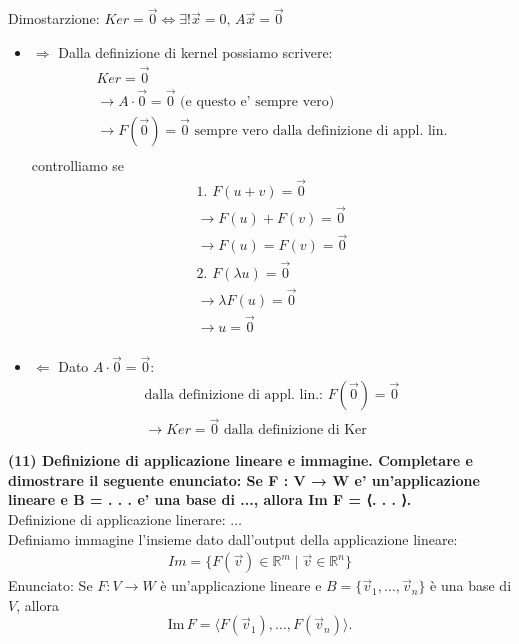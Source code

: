 \documentclass[10pt]{extarticle}
\begin{document}
Dimostarzione: $Ker=\vec{0} \iff \exists! \vec{x}=0, \, A\vec{x}=\vec{0}$ \\
\begin{itemize}
    \item $\Rightarrow$ Dalla definizione di kernel possiamo scrivere:
    \begin{align*}
        Ker=\vec{0} \\
        \to A\cdot\vec{0}=\vec{0} \text{ (e questo e' sempre vero)}\\
        \to F(\vec{0})=\vec{0} \text{ sempre vero dalla definizione di appl. lin.}\\
    \end{align*}
    controlliamo se 
    \begin{align*}
       \text{1. } F(u+v)=\vec{0}\\
       \to F(u)+F(v)=\vec{0} \\
       \to F(u)=F(v)=\vec{0} \\
       \text{2. } F(\lambda u)=\vec{0} \\
       \to \lambda F(u) =\vec{0} \\
       \to u=\vec{0} \\
    \end{align*}
    \item $\Leftarrow$ Dato $A\cdot \vec{0} = \vec{0}$:
    \begin{align*}
        \text{dalla definizione di appl. lin.: } F(\vec{0})=\vec{0} \\
        \to Ker=\vec{0} \text{ dalla definizione di Ker}
    \end{align*}
\end{itemize}
\vspace{1em} 
\textbf{(11) Definizione di applicazione lineare e immagine. Completare e dimostrare il seguente enunciato: Se F : V → W e' un’applicazione lineare e B = {. . . } e' una base di ..., allora
Im F = ⟨. . . ⟩.}\\
Definizione di applicazione linerare: $\dots$ \\
Definiamo immagine l'insieme dato dall'output della applicazione lineare:
\begin{align*}
    Im=\{F(\vec{v})\in \mathbb{R}^m \mid \vec{v}\in\mathbb{R}^n\}
\end{align*} 
Enunciato: Se $F : V \to W$ è un’applicazione lineare e $B = \{\vec{v}_1, \dots, \vec{v}_n\}$ è una base di $V$, allora 
\[
\text{Im}\, F = \langle F(\vec{v}_1), \dots, F(\vec{v}_n) \rangle.
\]
\end{document}
